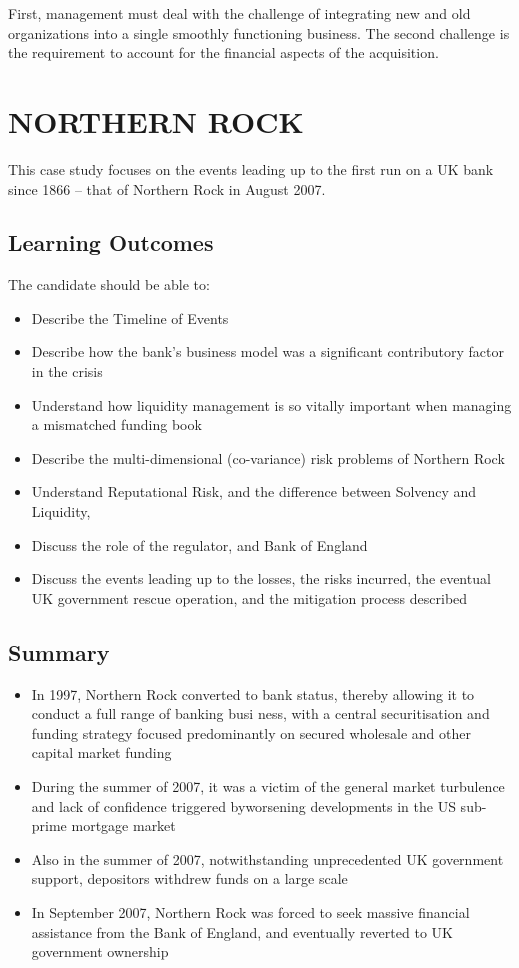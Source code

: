 \documentclass[]{article}
\begin{document}
First, management must deal with the challenge of integrating new and old organizations into a single smoothly functioning business. The second challenge is the requirement to account for the financial aspects of the acquisition.

\newpage
\section{NORTHERN ROCK}

This case study focuses on the events leading up to the first run on a UK bank since 1866 – that of Northern Rock in August 2007.

\subsection{Learning Outcomes}
The candidate should be able to:
\begin{itemize}
\item Describe the Timeline of Events
\item Describe how the bank’s business model was a significant contributory
factor in the crisis
\item Understand how liquidity management is so vitally important when
managing a mismatched funding book
\item Describe the multi-dimensional (co-variance) risk problems of Northern
Rock
\item Understand Reputational Risk, and the difference between Solvency and
Liquidity,
\item Discuss the role of the regulator, and Bank of England
\item Discuss the events leading up to the losses, the risks incurred, the eventual
UK government rescue operation, and the mitigation process described
\end{itemize}
\subsection{Summary}
\begin{itemize}
\item In 1997, Northern Rock converted to bank status, thereby allowing it to conduct a full range of banking busi
ness, with a central securitisation and funding strategy focused predominantly on secured wholesale and other
capital market funding
\item During the summer of 2007, it was a victim of the general market turbulence and lack of confidence triggered byworsening
developments in the US sub-prime mortgage market
\item Also in the summer of 2007, notwithstanding unprecedented UK government support, depositors withdrew funds
on a large scale
\item In September 2007, Northern Rock was forced to seek massive financial assistance from the Bank of England,
and eventually reverted to UK government ownership
\end{itemize}
 
\end{document}
